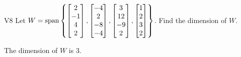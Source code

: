 \begin{problem}{V8}
Let \(
  W=\operatorname{span}\left\{
    \begin{bmatrix} 2 \\ -1 \\ 4 \\2 \end{bmatrix},
    \begin{bmatrix} -4 \\ 2 \\ -8 \\-4 \end{bmatrix},
    \begin{bmatrix} 3 \\ 12 \\ -9 \\2 \end{bmatrix},
    \begin{bmatrix} 1 \\ 2 \\ 3 \\2 \end{bmatrix}
  \right\}
\). Find the dimension of \(W\).
\end{problem}
\begin{solution}
The dimension of \(W\) is \(3\).
\end{solution}
